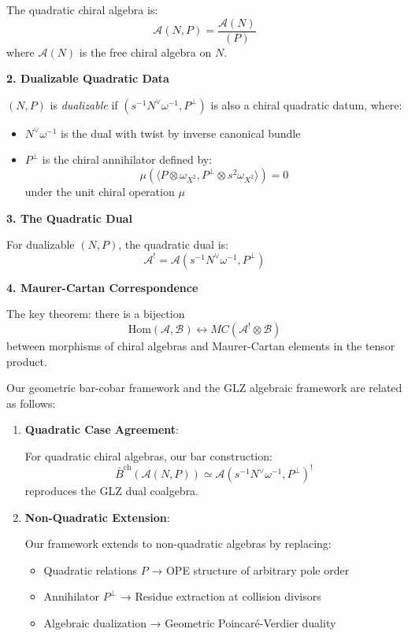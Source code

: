 \begin{example}
\begin{framework}
The quadratic chiral algebra is:
$$\mathcal{A}(N, P) = \frac{\mathcal{A}(N)}{(P)}$$
where $\mathcal{A}(N)$ is the free chiral algebra on $N$.

\textbf{2. Dualizable Quadratic Data}

$(N, P)$ is \emph{dualizable} if $(s^{-1}N^{\vee}\omega^{-1}, P^{\perp})$ is also a chiral 
quadratic datum, where:
\begin{itemize}
\item $N^{\vee}\omega^{-1}$ is the dual with twist by inverse canonical bundle
\item $P^{\perp}$ is the chiral annihilator defined by:
      $$\mu(\langle P \otimes \omega_{X^2}, P^{\perp} \otimes s^2\omega_{X^2}\rangle) = 0$$
      under the unit chiral operation $\mu$
\end{itemize}

\textbf{3. The Quadratic Dual}

For dualizable $(N, P)$, the quadratic dual is:
$$\mathcal{A}^! = \mathcal{A}(s^{-1}N^{\vee}\omega^{-1}, P^{\perp})$$

\textbf{4. Maurer-Cartan Correspondence}

The key theorem: there is a bijection
$$\text{Hom}(\mathcal{A}, \mathcal{B}) \leftrightarrow MC(\mathcal{A}^! \otimes \mathcal{B})$$
between morphisms of chiral algebras and Maurer-Cartan elements in the tensor product.
\end{framework}

\begin{theorem}
\label{thm:comparison-our-glz}
Our geometric bar-cobar framework and the GLZ algebraic framework are related as follows:

\begin{enumerate}
\item \textbf{Quadratic Case Agreement}:
   
   For quadratic chiral algebras, our bar construction:
   $$\bar{B}^{\text{ch}}(\mathcal{A}(N,P)) \simeq \mathcal{A}(s^{-1}N^{\vee}\omega^{-1}, P^{\perp})^!$$
   reproduces the GLZ dual coalgebra.

\item \textbf{Non-Quadratic Extension}:
   
   Our framework extends to non-quadratic algebras by replacing:
   \begin{itemize}
   \item Quadratic relations $P$ → OPE structure of arbitrary pole order
   \item Annihilator $P^{\perp}$ → Residue extraction at collision divisors
   \item Algebraic dualization → Geometric Poincaré-Verdier duality
   \end{itemize}


\end{enumerate}
\end{theorem}
\end{example}
